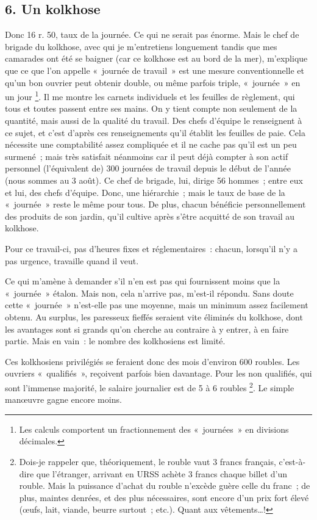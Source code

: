 \documentclass[french,twoside]{book} %
\begin{document}
\subsection[{6. Un kolkhose}]{6. Un kolkhose}
\noindent Donc 16 r. 50, taux de la journée. Ce qui ne serait pas énorme. Mais le chef de brigade du kolkhose, avec qui je m’entretiens longuement tandis que mes camarades ont été se baigner (car ce kolkhose est au bord de la mer), m’explique que ce que l’on appelle « journée de travail » est une mesure conventionnelle et qu’un bon ouvrier peut obtenir double, ou même parfois triple, « journée » en un jour \footnote{Les calculs comportent un fractionnement des « journées » en divisions décimales.}. Il me montre les carnets individuels et les feuilles de règlement, qui tous et toutes passent entre ses mains. On y tient compte non seulement de la quantité, mais aussi de la qualité du travail. Des chefs d’équipe le renseignent à ce sujet, et c’est d’après ces renseignements qu’il établit les feuilles de paie. Cela nécessite une comptabilité assez compliquée et il ne cache pas qu’il est un peu surmené ; mais très satisfait néanmoins car il peut déjà compter à son actif personnel (l’équivalent de) 300 journées de travail depuis le début de l’année (nous sommes au 3 août). Ce chef de brigade, lui, dirige 56 hommes ; entre eux et lui, des chefs d’équipe. Donc, une hiérarchie ; mais le taux de base de la « journée » reste le même pour tous. De plus, chacun bénéficie personnellement des produits de son jardin, qu’il cultive après s’être acquitté de son travail au kolkhose.\par
Pour ce travail-ci, pas d’heures fixes et réglementaires : chacun, lorsqu’il n’y a pas urgence, travaille quand il veut.\par
Ce qui m’amène à demander s’il n’en est pas qui fournissent moins que la « journée » étalon. Mais non, cela n’arrive pas, m’est-il répondu. Sans doute cette « journée » n’est-elle pas une moyenne, mais un minimum assez facilement obtenu. Au surplus, les paresseux fieffés seraient vite éliminés du kolkhose, dont les avantages sont si grands qu’on cherche au contraire à y entrer, à en faire partie. Mais en vain : le nombre des kolkhosiens est limité.\par
Ces kolkhosiens privilégiés se feraient donc des mois d’environ 600 roubles. Les ouvriers « qualifiés », reçoivent parfois bien davantage. Pour les non qualifiés, qui sont l’immense majorité, le salaire journalier est de 5 à 6 roubles \footnote{Dois-je rappeler que, théoriquement, le rouble vaut 3 francs français, c’est-à-dire que l’étranger, arrivant en URSS achète 3 francs chaque billet d’un rouble. Mais la puissance d’achat du rouble n’excède guère celle du franc ; de plus, maintes denrées, et des plus nécessaires, sont encore d’un prix fort élevé (œufs, lait, viande, beurre surtout ; etc.). Quant aux vêtements…!}. Le simple manœuvre gagne encore moins.\par
\end{document}
